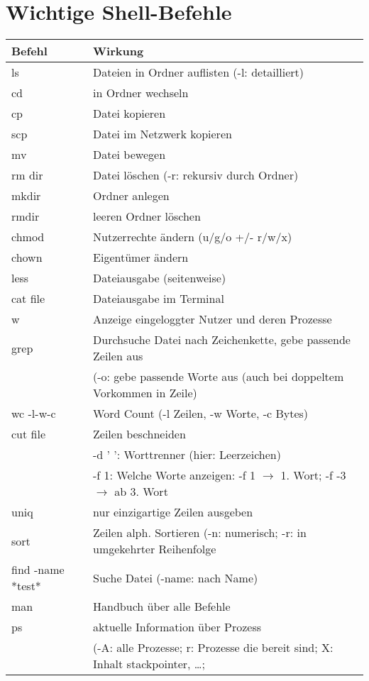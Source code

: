 \documentclass{scrreprt}
\renewcommand{\imptnt}[1]{#1}
\begin{document}
\section{Wichtige Shell-Befehle}
\begin{longtable}[l]{ p{} | p{} } 
Befehl & Wirkung\\
\hline
\imptnt{ls} & Dateien in Ordner auflisten (-l: detailliert)\\
\imptnt{cd} & in Ordner wechseln\\
\imptnt{cp} & Datei kopieren\\
scp & Datei im Netzwerk kopieren\\
\imptnt{mv} & Datei bewegen\\
\imptnt{rm} dir & Datei löschen (-r: rekursiv durch Ordner)\\
\imptnt{mkdir} & Ordner anlegen\\
rmdir & leeren Ordner löschen\\
\imptnt{chmod} & Nutzerrechte ändern (u/g/o +/- r/w/x)\\
chown & Eigentümer ändern\\
\imptnt{less} & Dateiausgabe (seitenweise)\\
\imptnt{cat} file & Dateiausgabe im Terminal\\
w & Anzeige eingeloggter Nutzer und deren Prozesse\\
\imptnt{grep} & Durchsuche Datei nach Zeichenkette, gebe passende Zeilen aus \\
&(-o: gebe passende Worte aus (auch bei doppeltem Vorkommen in Zeile) \\
\imptnt{wc} -l-w-c & Word Count (-l Zeilen, -w Worte, -c Bytes)\\
\imptnt{cut} file & Zeilen beschneiden\\
& -d ' ': Worttrenner (hier: Leerzeichen)\\
& -f 1: Welche Worte anzeigen: -f 1 $\to$ 1. Wort; -f -3 $\to$ ab 3. Wort\\
\imptnt{uniq} & nur einzigartige Zeilen ausgeben\\
\imptnt{sort} & Zeilen alph. Sortieren (-n: numerisch; -r: in umgekehrter Reihenfolge\\
\imptnt{find} -name *test* & Suche Datei (-name: nach Name)\\
\imptnt{man} & Handbuch über alle Befehle\\
ps & aktuelle Information über Prozess \\
&(-A: alle Prozesse; r: Prozesse die bereit sind; X: Inhalt stackpointer, …;\\

\end{longtable}
\end{document}
